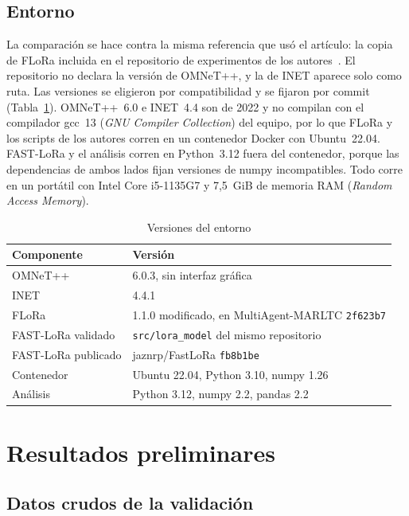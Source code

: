 \documentclass[conference,a4paper]{IEEEtran}
\begin{document}
\subsection{Entorno}

La comparación se hace contra la misma referencia que usó el artículo: la copia de FLoRa incluida en el repositorio de experimentos de los autores~\cite{repomarltc}. El repositorio no declara la versión de OMNeT++, y la de INET aparece solo como ruta. Las versiones se eligieron por compatibilidad y se fijaron por commit (Tabla~\ref{tab:entorno}). OMNeT++~6.0 e INET~4.4 son de 2022 y no compilan con el compilador gcc~13 (\emph{GNU Compiler Collection}) del equipo, por lo que FLoRa y los scripts de los autores corren en un contenedor Docker con Ubuntu~22.04. FAST-LoRa y el análisis corren en Python~3.12 fuera del contenedor, porque las dependencias de ambos lados fijan versiones de numpy incompatibles. Todo corre en un portátil con Intel Core i5-1135G7 y 7,5~GiB de memoria RAM (\emph{Random Access Memory}).

\begin{table}[t]
\centering
\caption{Versiones del entorno}
\label{tab:entorno}
\footnotesize
\renewcommand{\arraystretch}{1.1}
\begin{tabular}{@{}ll@{}}
\toprule
Componente & Versión \\ \midrule
OMNeT++ & 6.0.3, sin interfaz gráfica \\
INET & 4.4.1 \\
FLoRa & 1.1.0 modificado, en MultiAgent-MARLTC \texttt{2f623b7} \\
FAST-LoRa validado & \texttt{src/lora\_model} del mismo repositorio \\
FAST-LoRa publicado & jaznrp/FastLoRa \texttt{fb8b1be} \\
Contenedor & Ubuntu 22.04, Python 3.10, numpy 1.26 \\
Análisis & Python 3.12, numpy 2.2, pandas 2.2 \\
\bottomrule
\end{tabular}
\end{table}

\section{Resultados preliminares}

\subsection{Datos crudos de la validación}
\end{document}
